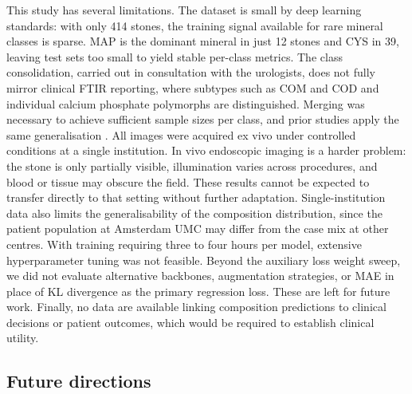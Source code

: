 \documentclass[10pt,twocolumn]{article}
\begin{document}
This study has several limitations. The dataset is small by deep learning standards: with only 414 stones, the training signal available for rare mineral classes is sparse. MAP is the dominant mineral in just 12 stones and CYS in 39, leaving test sets too small to yield stable per-class metrics.
The class consolidation, carried out in consultation with the urologists, does not fully mirror clinical FTIR reporting, where subtypes such as COM and COD and individual calcium phosphate polymorphs are distinguished. Merging was necessary to achieve sufficient sample sizes per class, and prior studies apply the same generalisation \cite{Serrat2017, Black2020, Kim2022}.
All images were acquired ex vivo under controlled conditions at a single institution. In vivo endoscopic imaging is a harder problem: the stone is only partially visible, illumination varies across procedures, and blood or tissue may obscure the field. These results cannot be expected to transfer directly to that setting without further adaptation. Single-institution data also limits the generalisability of the composition distribution, since the patient population at Amsterdam UMC may differ from the case mix at other centres.
With training requiring three to four hours per model, extensive hyperparameter tuning was not feasible. Beyond the auxiliary loss weight sweep, we did not evaluate alternative backbones, augmentation strategies, or MAE in place of KL divergence as the primary regression loss. These are left for future work. Finally, no data are available linking composition predictions to clinical decisions or patient outcomes, which would be required to establish clinical utility.
 
\subsection*{Future directions}
 
\end{document}
